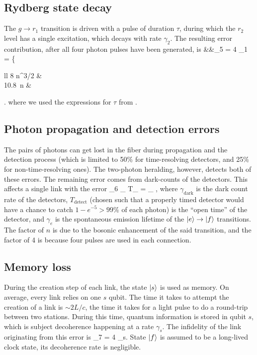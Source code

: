 \subsection{Rydberg state decay}
The $g\rightarrow r_1$ transition is driven with a pulse of duration $\tau$,
during which the $r_2$ level has a single excitation, which decays with rate
$\gamma_2$. The resulting error contribution, after all four photon pulses have
been generated, is
\bal
\label{eq:f5}
	&&\eps_5  = 4 \gamma_1 \tau = 
	\left\{
	\begin{array}{ll}
	8 n^{3/2}  & 
	\\
	10.8\, n  & 
	\end{array}
	\right.
\eal
where we used the expressions for $\tau$ from .

\subsection{Photon propagation and detection errors}
The pairs of photons can get lost in the fiber during propagation and the
detection process (which is limited to 50\% for time-resolving detectors,  and
25\% for non-time-resolving ones). The two-photon heralding, however, detects
both of these errors. The remaining error comes from dark-counts of the
detectors. This affects a single link with the error
\bel
\label{eq:f6}
	\eps_6  \gamma_
	T_ = \gamma_ ,
\eel
where $\gamma_\mathrm{dark}$ is the dark count rate of the detectors,
 $T_\mathrm{detect}$ (chosen such that a properly timed detector would have a
 chance to catch $1 -e^{-5} >  99\%$ of each photon) is the ``open time'' of the
 detector, and $\gamma_{e}$ is the spontaneous emission lifetime of the
 $| e \rangle\rightarrow | f \rangle$ transitions.
 The factor of $n$ is due to the bosonic enhancement of the said transition, and
 the factor of 4 is because four pulses are used in each connection.


\subsection{Memory loss}
During the creation step of each link, the state $| s \rangle$ is used as memory.
On average, every link relies on one $s$ qubit. The time it takes to attempt the
creation of a link is $\sim 2L/c$, the time it takes for a light pulse to do a
round-trip between two stations.
During this time, quantum information is stored in qubit $s$, which is subject
decoherence happening at a rate $\gamma_s$.
The infidelity of the link originating from this error is
\bel
\label{eq:f7}
	\eps_7 = 4	\gamma_s.
\eel
State $| f \rangle$ is assumed to be a long-lived clock state, its decoherence rate
is negligible.

